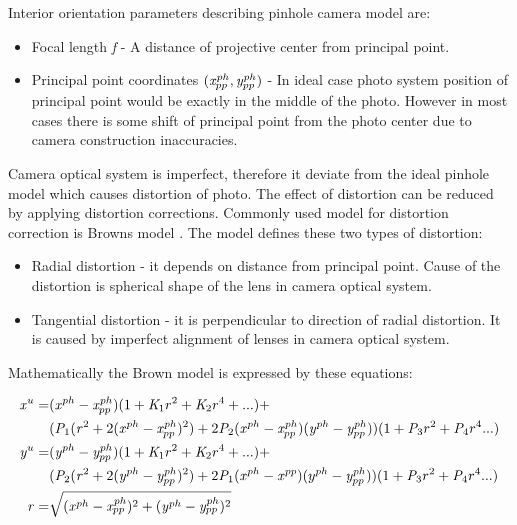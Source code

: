 \documentclass[a4paper,12pt]{article}
\newcommand{\escal}[1]{
{\it #1}
}
\begin{document}
Interior orientation parameters describing pinhole camera model are:
\begin{itemize}
  \item Focal length \escal{f} - A distance of projective center from principal point.
  \item Principal point coordinates $(\escal{x}^{ph}_{pp}, \escal{y}^{ph}_{pp})$ - In ideal case photo system position of principal point would be exactly in the middle 
	of the photo.  However in most cases there is some shift of principal point from the photo center due to
	camera construction inaccuracies.
\end{itemize}

Camera optical system is imperfect, therefore it deviate from the ideal pinhole model which 
 causes distortion of photo.
The effect of distortion can be reduced by applying distortion corrections. Commonly 
used model for distortion correction is Browns model \cite{brown1966distortion}.
The model defines these two types of distortion:
\begin{itemize}
  \item Radial distortion - it depends on distance from principal point. Cause of the distortion is spherical shape of the 
  lens in camera optical system.
  \item Tangential distortion - it is perpendicular to direction of radial distortion. It is caused by 
       imperfect alignment of lenses in camera optical system.
\end{itemize}

Mathematically the Brown model is expressed by these equations:

\begin{equation}
\label{eq:undistort}
\begin{split}
\escal{x}^{u} =& (\escal{x}^{ph} - \escal{x}^{ph}_{pp})(1 + \escal{K}_{1}r^2 + \escal{K}_2r^4 + ...) + \\
&(\escal{P}_1(\escal{r}^2 + 2(\escal{x}^{ph} - \escal{x}^{ph}_{pp})^2) + 2\escal{P}_2(\escal{x}^{ph} - \escal{x}^{ph}_{pp})(\escal{y}^{ph} - \escal{y}^{ph}_{pp}))(1 + \escal{P}_3r^2 + \escal{P}_4r^4 ...) \\
\escal{y}^{u} =& (\escal{y}^{ph} - \escal{y}^{ph}_{pp})(1 + \escal{K}_1r^2 + \escal{K}_2r^4 + ...) + \\
&(\escal{P}_2(\escal{r}^2 + 2(\escal{y}^{ph} - \escal{y}^{ph}_{pp})^2) + 2\escal{P}_1(\escal{x}^{ph} - \escal{x}^{pp})(y^{ph} - \escal{y}^{ph}_{pp}))(1 + \escal{P}_3r^2 + \escal{P}_4r^4 ...) \\
\escal{r} =& \sqrt{(\escal{x}^{ph} - \escal{x}^{ph}_{pp})^2 + (\escal{y}^{ph} - \escal{y}^{ph}_{pp})^2}
\end{split}
\end{equation}
\end{document}
